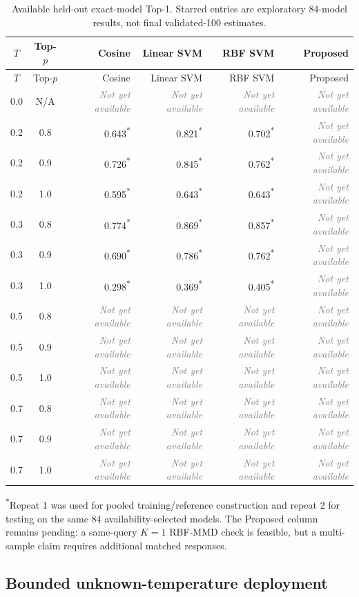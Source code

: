 \documentclass[11pt,a4paper]{article}
\newcommand{\todoresult}{\textcolor{gray}{\textit{Not yet available}}}
\newcommand{\demovalue}[1]{\textcolor{blue!65!black}{#1\textsuperscript{*}}}
\begin{document}
\begin{longtable}{ccrrrr}
\caption{Available held-out exact-model Top-1. Starred entries are exploratory
84-model results, not final validated-100 estimates.}\label{tab:per-setting}\\
\toprule
$T$ & Top-$p$ & Cosine & Linear SVM & RBF SVM & Proposed \\
\midrule
\endfirsthead
\toprule
$T$ & Top-$p$ & Cosine & Linear SVM & RBF SVM & Proposed \\
\midrule
\endhead
0.0 & N/A & \todoresult & \todoresult & \todoresult & \todoresult \\
0.2 & 0.8 & \demovalue{0.643} & \demovalue{0.821} & \demovalue{0.702} & \todoresult \\
0.2 & 0.9 & \demovalue{0.726} & \demovalue{0.845} & \demovalue{0.762} & \todoresult \\
0.2 & 1.0 & \demovalue{0.595} & \demovalue{0.643} & \demovalue{0.643} & \todoresult \\
0.3 & 0.8 & \demovalue{0.774} & \demovalue{0.869} & \demovalue{0.857} & \todoresult \\
0.3 & 0.9 & \demovalue{0.690} & \demovalue{0.786} & \demovalue{0.762} & \todoresult \\
0.3 & 1.0 & \demovalue{0.298} & \demovalue{0.369} & \demovalue{0.405} & \todoresult \\
0.5 & 0.8 & \todoresult & \todoresult & \todoresult & \todoresult \\
0.5 & 0.9 & \todoresult & \todoresult & \todoresult & \todoresult \\
0.5 & 1.0 & \todoresult & \todoresult & \todoresult & \todoresult \\
0.7 & 0.8 & \todoresult & \todoresult & \todoresult & \todoresult \\
0.7 & 0.9 & \todoresult & \todoresult & \todoresult & \todoresult \\
0.7 & 1.0 & \todoresult & \todoresult & \todoresult & \todoresult \\
\bottomrule
\end{longtable}

\noindent\textsuperscript{*}Repeat 1 was used for pooled training/reference
construction and repeat 2 for testing on the same 84 availability-selected
models. The Proposed column remains pending: a same-query $K=1$ RBF-MMD check
is feasible, but a multi-sample claim requires additional matched responses.

\subsection{Bounded unknown-temperature deployment}
\end{document}
